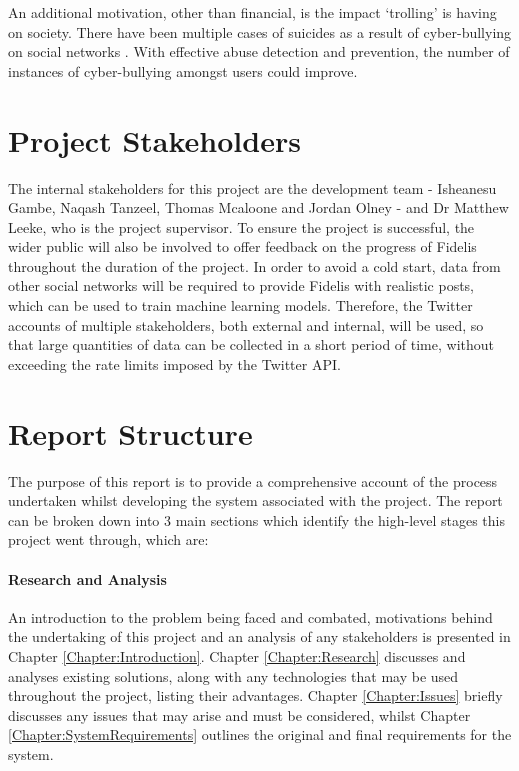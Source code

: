 An additional motivation, other than financial, is the impact `trolling' is having on society. There have been multiple cases of suicides as a result of cyber-bullying on social networks \cite{NoBullying:Cyber}. With effective abuse detection and prevention, the number of instances of cyber-bullying amongst users could improve.

\section{Project Stakeholders}
The internal stakeholders for this project are the development team - Isheanesu Gambe, Naqash Tanzeel, Thomas Mcaloone and Jordan Olney - and Dr Matthew Leeke, who is the project supervisor. To ensure the project is successful, the wider public will also be involved to offer feedback on the progress of Fidelis throughout the duration of the project. In order to avoid a cold start, data from other social networks will be required to provide Fidelis with realistic posts, which can be used to train machine learning models. Therefore, the Twitter accounts of multiple stakeholders, both external and internal, will be used, so that large quantities of data can be collected in a short period of time, without exceeding the rate limits imposed by the Twitter API.

\section{Report Structure}
The purpose of this report is to provide a comprehensive account of the process undertaken whilst developing the system associated with the project. The report can be broken down into 3 main sections which identify the high-level stages this project went through, which are:

\paragraph{Research and Analysis}
An introduction to the problem being faced and combated, motivations behind the undertaking of this project and an analysis of any stakeholders is presented in Chapter \ref{Chapter:Introduction}. Chapter \ref{Chapter:Research} discusses and analyses existing solutions, along with any technologies that may be used throughout the project, listing their advantages. Chapter \ref{Chapter:Issues} briefly discusses any issues that may arise and must be considered, whilst Chapter \ref{Chapter:SystemRequirements} outlines the original and final requirements for the system.

